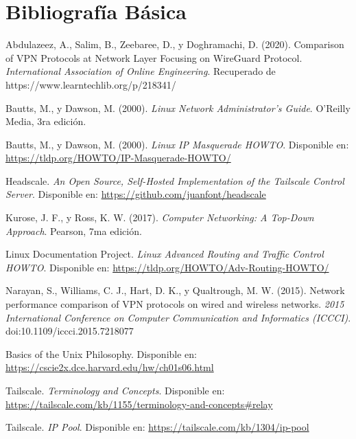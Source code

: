 \documentclass[letterpaper,12pt,oneside]{article}
\begin{document}
    \section{Bibliografía Básica}

    \begin{thebibliography}{99}

        Abdulazeez, A., Salim, B., Zeebaree, D., y Doghramachi, D. (2020). Comparison of VPN Protocols at Network Layer Focusing on WireGuard Protocol. \textit{International Association of Online Engineering}. Recuperado de https://www.learntechlib.org/p/218341/
        
        Bautts, M., y Dawson, M. (2000). \textit{Linux Network Administrator’s Guide}. O’Reilly Media, 3ra edición.
        
        Bautts, M., y Dawson, M. (2000). \textit{Linux IP Masquerade HOWTO}. Disponible en: \url{https://tldp.org/HOWTO/IP-Masquerade-HOWTO/}
        
        Headscale. \textit{An Open Source, Self-Hosted Implementation of the Tailscale Control Server}. Disponible en: \url{https://github.com/juanfont/headscale}
        
        Kurose, J. F., y Ross, K. W. (2017). \textit{Computer Networking: A Top-Down Approach}. Pearson, 7ma edición.
        
        Linux Documentation Project. \textit{Linux Advanced Routing and Traffic Control HOWTO}. Disponible en: \url{https://tldp.org/HOWTO/Adv-Routing-HOWTO/}
        
        Narayan, S., Williams, C. J., Hart, D. K., y Qualtrough, M. W. (2015). Network performance comparison of VPN protocols on wired and wireless networks. \textit{2015 International Conference on Computer Communication and Informatics (ICCCI)}. doi:10.1109/iccci.2015.7218077
        
        Basics of the Unix Philosophy. Disponible en: \url{https://cscie2x.dce.harvard.edu/hw/ch01s06.html}
        
        Tailscale. \textit{Terminology and Concepts}. Disponible en: \url{https://tailscale.com/kb/1155/terminology-and-concepts#relay}
        
        Tailscale. \textit{IP Pool}. Disponible en: \url{https://tailscale.com/kb/1304/ip-pool}
        

\end{thebibliography}
\end{document}
